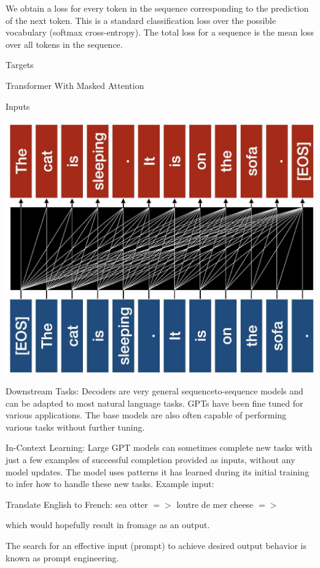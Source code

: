 \documentclass[10pt]{article}
\begin{document}
We obtain a loss for every token in the sequence corresponding to the prediction of the next token. This is a standard classification loss over the possible vocabulary (softmax cross-entropy). The total loss for a sequence is the mean loss over all tokens in the sequence.

Targets

Transformer With Masked Attention

Inputs

\begin{center}
\includegraphics[max width=\textwidth]{2024_01_08_7c14f4867d7823fc5a52g-09}
\end{center}

Downstream Tasks: Decoders are very general sequenceto-sequence models and can be adapted to most natural language tasks. GPTs have been fine tuned for various applications. The base models are also often capable of performing various tasks without further tuning.

In-Context Learning: Large GPT models can sometimes complete new tasks with just a few examples of successful completion provided as inputs, without any model updates. The model uses patterns it has learned during its initial training to infer how to handle these new tasks. Example input:

Translate English to French: sea otter $=>$ loutre de mer cheese $=>$

which would hopefully result in fromage as an output.

The search for an effective input (prompt) to achieve desired output behavior is known as prompt engineering.
\end{document}
